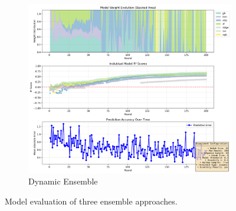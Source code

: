 \documentclass[conference]{IEEEtran}
\begin{document}
\begin{figure}[htbp]
    \vspace{1em}

    \begin{subfigure}[b]{0.8\linewidth}
        \includegraphics[width=\linewidth]{images/model_evolution_r200_b32_l10_dynamic.png}
        \caption{Dynamic Ensemble}
        \label{fig:dynamic_model}
    \end{subfigure}

    \caption{Model evaluation of three ensemble approaches.}
    \label{fig:model_evaluation_basic}
\end{figure}

\end{document}

